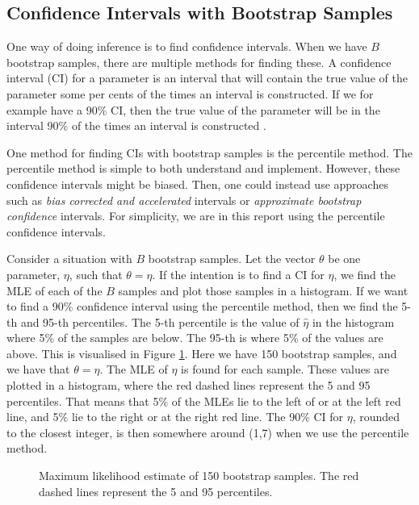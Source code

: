 
\subsection{Confidence Intervals with Bootstrap Samples}
\label{theory_ci_bootstrap}
One way of doing inference is to find confidence intervals. When we have $B$ bootstrap samples, there are multiple methods for finding these.  
A confidence interval (CI) for a parameter is an interval that will contain the true value of the parameter some per cents of the times an interval is constructed. If we for example have a 90\% CI, then the true value of the parameter will be in the interval 90\% of the times an interval is constructed \citep{bootstrap}.

One method for finding CIs with bootstrap samples is the percentile method. The percentile method is simple to both understand and implement. However, these confidence intervals might be biased. Then, one could instead use approaches such as \textit{bias corrected and accelerated} intervals or \textit{approximate bootstrap confidence} intervals. For simplicity, we are in this report using the percentile confidence intervals. 


Consider a situation with $B$ bootstrap samples. Let the vector $\theta$ be one parameter, $\eta$, such that  $\theta = \eta$. If the intention is to find a CI for $\eta$, we find the MLE of each of the $B$ samples and plot those samples in a histogram. If we want to find a 90\% confidence interval using the percentile method, then we find the 5-th and 95-th percentiles. The 5-th percentile is the value of $\hat{\eta}$ in the histogram where 5\% of the samples are below. The 95-th is where 5\% of the values are above. This is visualised in Figure \ref{percentile_ci_example}. Here we have 150 bootstrap samples, and we have that $\theta=\eta$. The MLE of $\eta$ is found for each sample. These values are plotted in a histogram, where the red dashed lines represent the 5 and 95 percentiles. That means that 5\% of the MLEs lie to the left of or at the left red line, and 5\% lie to the right or at the right red line. The 90\% CI for $\eta$, rounded to the closest integer, is then somewhere around (1,7) when we use the percentile method.
\begin{figure}
    \centering
    
    \caption[Bootstrap Example]{Maximum likelihood estimate of 150 bootstrap samples. The red dashed lines represent the 5 and 95 percentiles.}
    \label{percentile_ci_example}
\end{figure}

